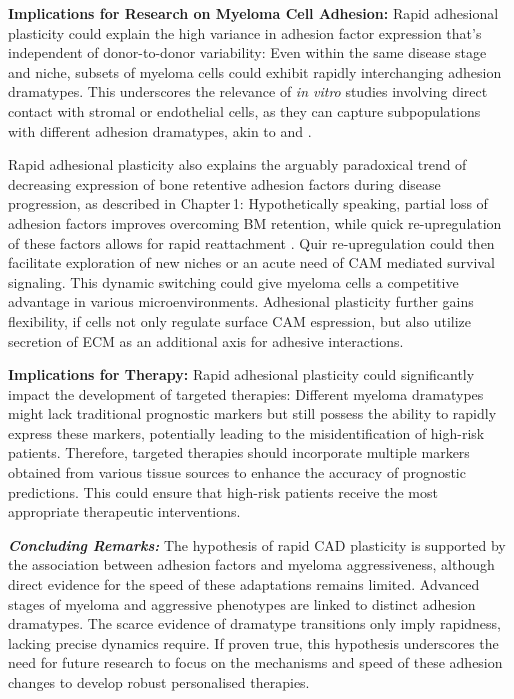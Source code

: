 \textbf{Implications for Research on Myeloma Cell Adhesion:}
Rapid adhesional plasticity could explain the high variance in adhesion factor
expression that's independent of donor-to-donor variability: Even within the
same disease stage and niche, subsets of myeloma cells could exhibit rapidly
interchanging adhesion dramatypes. This underscores the relevance of \textit{in
      vitro} studies involving direct contact with stromal or endothelial cells, as
they can capture subpopulations with different adhesion dramatypes, akin to
\MAina and \nMAina.

Rapid adhesional plasticity also explains the arguably paradoxical trend of
decreasing expression of bone retentive adhesion
factors during disease progression, as
described in Chapter\,1: Hypothetically speaking, partial loss of adhesion
factors improves overcoming \ac{BM} retention, while quick re-upregulation of
these factors allows for rapid reattachment . Quir
re-upregulation could then facilitate exploration of new niches or an acute need
of \ac{CAM} mediated survival signaling. This dynamic switching could give
myeloma cells a competitive advantage in various microenvironments. Adhesional
plasticity further gains flexibility, if cells not only regulate surface
\ac{CAM} espression, but also utilize secretion of \ac{ECM} as an additional
axis for adhesive interactions.



\textbf{Implications for Therapy:}
Rapid adhesional plasticity could significantly impact the development of
targeted therapies: Different myeloma dramatypes might lack traditional
prognostic markers but still possess the ability to rapidly express these
markers, potentially leading to the misidentification of high-risk patients.
Therefore, targeted therapies should incorporate multiple markers obtained from
various tissue sources to enhance the accuracy of prognostic predictions. This
could ensure that high-risk patients receive the most appropriate therapeutic
interventions.



\textbf{\textit{Concluding Remarks:}} The hypothesis of rapid \ac{CAD}
plasticity is supported by the association between adhesion factors and myeloma
aggressiveness, although direct evidence for the speed of these adaptations
remains limited. Advanced stages of myeloma and aggressive phenotypes are linked
to distinct adhesion dramatypes. The scarce evidence of dramatype transitions
only imply rapidness, lacking precise dynamics require. If proven true, this
hypothesis underscores the need for future research to focus on the mechanisms
and speed of these adhesion changes to develop robust personalised therapies.




